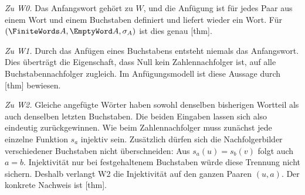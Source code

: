 \noindent\begin{minipage}{\linewidth}

\smallskip\noindent\textit{Zu W0.} Das Anfangswort gehört zu \(W\), und
die Anfügung ist für jedes Paar aus einem Wort und einem Buchstaben
definiert und liefert wieder ein Wort. Für
\((\FiniteWords A,\EmptyWord A,\sigma_A)\) ist dies genau
[thm].
\end{minipage}\par

\noindent\begin{minipage}{\linewidth}

\smallskip\noindent\textit{Zu W1.} Durch das Anfügen eines Buchstabens
entsteht niemals das Anfangswort. Dies überträgt die Eigenschaft, dass
Null kein Zahlennachfolger ist, auf alle Buchstabennachfolger zugleich.
Im Anfügungsmodell ist diese Aussage durch
[thm] bewiesen.
\end{minipage}\par

\noindent\begin{minipage}{\linewidth}

\smallskip\noindent\textit{Zu W2.} Gleiche angefügte Wörter haben sowohl
denselben bisherigen Wortteil als auch denselben letzten Buchstaben.
Die beiden Eingaben lassen sich also eindeutig zurückgewinnen.
Wie beim Zahlennachfolger muss zunächst jede einzelne Funktion \(s_a\)
injektiv sein. Zusätzlich dürfen sich die Nachfolgerbilder
verschiedener Buchstaben nicht überschneiden: Aus
\(s_a(u)=s_b(v)\) folgt auch \(a=b\). Injektivität nur bei
festgehaltenem Buchstaben würde diese Trennung nicht sichern.
Deshalb verlangt W2 die Injektivität auf den ganzen Paaren \((u,a)\).
Der konkrete Nachweis ist
[thm].
\end{minipage}\par

